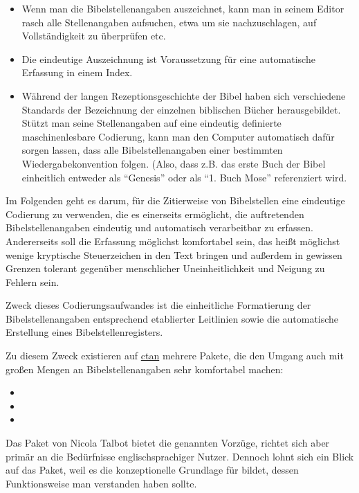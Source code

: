 \begin{itemize}
    \item Wenn man die Bibelstellenangaben auszeichnet, kann man in seinem Editor rasch alle
    Stellenangaben aufsuchen, etwa um sie nachzuschlagen, auf Vollständigkeit zu überprüfen etc.
    \item Die eindeutige Auszeichnung ist Voraussetzung für eine automatische Erfassung in einem
    Index.
    \item Während der langen Rezeptionsgeschichte der Bibel haben sich verschiedene Standards der 
    Bezeichnung der einzelnen biblischen Bücher herausgebildet. Stützt man seine Stellenangaben
    auf eine eindeutig definierte maschinenlesbare Codierung, kann man den Computer automatisch 
    dafür sorgen lassen, dass alle Bibelstellenangaben einer bestimmten Wiedergabekonvention folgen.
    (Also, dass z.B. das erste Buch der Bibel einheitlich entweder als \enquote{Genesis} oder als \enquote{1. Buch Mose}
    referenziert wird.
\end{itemize}

Im Folgenden geht es darum, für die Zitierweise von Bibelstellen eine eindeutige Codierung zu verwenden, 
die es einerseits ermöglicht, die auftretenden Bibelstellenangaben eindeutig und automatisch 
verarbeitbar zu erfassen. 
Andererseits soll die Erfassung möglichst komfortabel sein, das heißt möglichst wenige 
kryptische Steuerzeichen in den Text bringen und außerdem in gewissen Grenzen tolerant gegenüber 
menschlicher Uneinheitlichkeit und Neigung zu Fehlern sein.

Zweck dieses Codierungsaufwandes ist die einheitliche Formatierung der Bibelstellenangaben
entsprechend etablierter Leitlinien sowie die automatische Erstellung eines Bibelstellenregisters.

Zu diesem Zweck existieren auf \url{ctan} mehrere Pakete, die den Umgang 
auch mit großen Mengen an Bibelstellenangaben sehr komfortabel machen:

\begin{itemize}
    \item {} 
    \item {} 
    \item {} 
\end{itemize}


Das Paket  von Nicola Talbot bietet die genannten Vorzüge, richtet sich aber primär
an die Bedürfnisse englischsprachiger Nutzer. 
Dennoch lohnt sich ein Blick auf das Paket, weil es die konzeptionelle Grundlage für
 bildet, dessen Funktionsweise man verstanden haben sollte.

